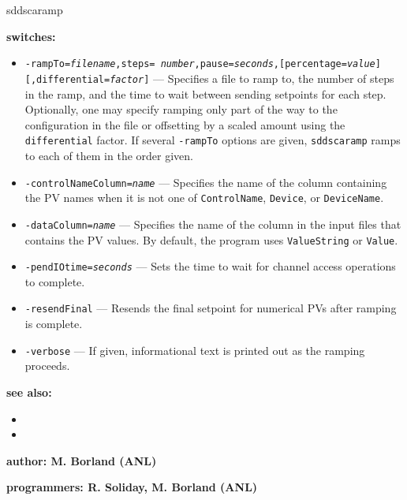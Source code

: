 \begin{sddsprog}{sddscaramp}
%
\item {\bf switches:}
%
%
    \begin{itemize}
        \item {\tt -rampTo={\em filename},steps={\em
        number},pause={\em seconds},[percentage={\em value}][,differential={\em factor}]} ---
        Specifies a file to ramp to, the number of steps in the ramp,
        and the time to wait between sending setpoints for each step.
        Optionally, one may specify ramping only part of the way to
        the configuration in the file or offsetting by a scaled
        amount using the {\tt differential} factor.  If several
        {\tt -rampTo} options are given, {\tt sddscaramp} ramps to each
        of them in the order given.
        \item {\tt -controlNameColumn={\em name}} --- Specifies the
        name of the column containing the PV names when it is not
        one of {\tt ControlName}, {\tt Device}, or {\tt DeviceName}.
        \item {\tt -dataColumn={\em name}} --- Specifies the name of
        the column in the input files that contains the PV values.
        By default, the program uses {\tt ValueString} or {\tt Value}.
        \item {\tt -pendIOtime={\em seconds}} --- Sets the time to
        wait for channel access operations to complete.
        \item {\tt -resendFinal} --- Resends the final setpoint for
        numerical PVs after ramping is complete.
        \item {\tt -verbose} --- If given, informational text is
        printed out as the ramping proceeds.
      \end{itemize}

\item {\bf see also:}
    \begin{itemize}
%
%
    \item {}
    \item {}
    \end{itemize}
%
%
\item {\bf author: M. Borland (ANL)}
\item {\bf programmers: R. Soliday, M. Borland (ANL)}
\end{sddsprog}
